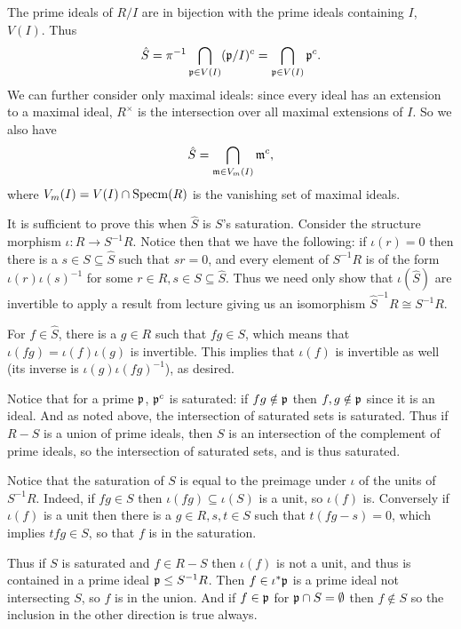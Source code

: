         The prime ideals of $R/I$ are in bijection with the prime ideals containing $I$, $V(I)$.
        Thus
        $$ \hat S = \pi^{-1}\bigcap_{{{\frak p}}\in V(I)}({{\frak p}}/I)^c = \bigcap_{{{\frak p}}\in V(I)}{{\frak p}}^c . $$
        We can further consider only maximal ideals: since every ideal has an extension to a maximal ideal, $R^\times$ is the intersection over all maximal
        extensions of $I$.
        So we also have
        $$ \hat S = \bigcap_{{{\frak m}}\in V_m(I)}{{\frak m}}^c , $$
        where $V_m(I)=V(I)\cap{\rm Specm}(R)$ is the vanishing set of maximal ideals.

        \item It is sufficient to prove this when $\hat S$ is $S$'s saturation.
        Consider the structure morphism $\iota\colon R\to S^{-1}R$.
        Notice then that we have the following: if $\iota(r)=0$ then there is a $s\in S\subseteq\hat S$ such that $sr=0$, and every element of $S^{-1}R$ is of the form
        $\iota(r)\iota(s)^{-1}$ for some $r\in R,s\in S\subseteq\hat S$.
        Thus we need only show that $\iota(\hat S)$ are invertible to apply a result from lecture giving us an isomorphism $\hat S^{-1}R\cong S^{-1}R$.

        For $f\in\hat S$, there is a $g\in R$ such that $fg\in S$, which means that $\iota(fg)=\iota(f)\iota(g)$ is invertible.
        This implies that $\iota(f)$ is invertible as well (its inverse is $\iota(g)\iota(fg)^{-1}$), as desired.

        \item Notice that for a prime ${{\frak p}}$, ${{\frak p}}^c$ is saturated: if $fg\notin{{\frak p}}$ then $f,g\notin{{\frak p}}$ since it is an ideal.
        And as noted above, the intersection of saturated sets is saturated.
        Thus if $R-S$ is a union of prime ideals, then $S$ is an intersection of the complement of prime ideals, so the intersection of saturated sets, and is thus saturated.

        Notice that the saturation of $S$ is equal to the preimage under $\iota$ of the units of $S^{-1}R$.
        Indeed, if $fg\in S$ then $\iota(fg)\subseteq\iota(S)$ is a unit, so $\iota(f)$ is.
        Conversely if $\iota(f)$ is a unit then there is a $g\in R,s,t\in S$ such that $t(fg-s)=0$, which implies $tfg\in S$, so that $f$ is in the saturation.

        Thus if $S$ is saturated and $f\in R-S$ then $\iota(f)$ is not a unit, and thus is contained in a prime ideal ${{\frak p}}\leq S^{-1}R$.
        Then $f\in\iota^*{{\frak p}}$ is a prime ideal not intersecting $S$, so $f$ is in the union.
        And if $f\in{{\frak p}}$ for ${{\frak p}}\cap S=\emptyset$ then $f\notin S$ so the inclusion in the other direction is true always.

